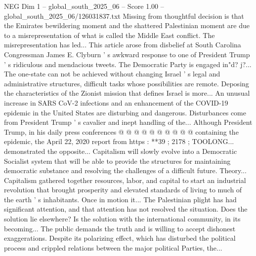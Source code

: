 \begin{textsample}{NEG Dim 1 – global\_south\_2025\_06 – Score 1.00 – global\_south\_2025\_06/126031837.txt}
Missing from thoughtful decision is that the Emirates bewildering moment and the shattered Palestinian moment are due to a misrepresentation of what is called the Middle East conflict.
The misrepresentation has led...
This article arose from disbelief at South Carolina Congressman James E.
Clyburn ' s awkward response to one of President Trump ' s ridiculous and mendacious tweets.
The Democratic Party is engaged in"d? j?...
The one-state can not be achieved without changing Israel ' s legal and administrative structures, difficult tasks whose possibilities are remote.
Deposing the characteristics of the Zionist mission that defines Israel is more...
An unusual increase in SARS CoV-2 infections and an enhancement of the COVID-19 epidemic in the United States are disturbing and dangerous.
Disturbances come from President Trump ' s cavalier and inept handling of the...
Although President Trump, in his daily press conferences @ @ @ @ @ @ @ @ @ @ containing the epidemic, the April 22, 2020 report from https : **39 ; 2178 ; TOOLONG... demonstrated the opposite...
Capitalism will slowly evolve into a Democratic Socialist system that will be able to provide the structures for maintaining democratic substance and resolving the challenges of a difficult future.
Theory...
Capitalism gathered together resources, labor, and capital to start an industrial revolution that brought prosperity and elevated standards of living to much of the earth ' s inhabitants.
Once in motion it...
The Palestinian plight has had significant attention, and that attention has not resolved the situation.
Does the solution lie elsewhere?
Is the solution with the international community, in its becoming...
The public demands the truth and is willing to accept dishonest exaggerations.
Despite its polarizing effect, which has disturbed the political process and crippled relations between the major political Parties, the...

\end{textsample}
